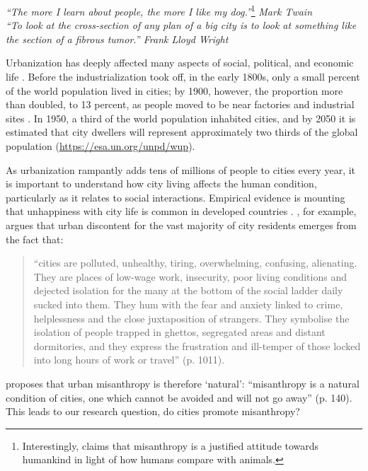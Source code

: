 \documentclass[11pt, letterpaper]{article}
\newcommand{\emd}[1]{\ExecuteMetaData[/tmp/tex]{#1}} %
\begin{document}
\begin{spacing}{1.4} %
\vspace{.25in}

{\small\it \noindent ``The more I learn about people, the more I like my dog.''}\footnote{Interestingly, \citet{cooper2018animals} claims that misanthropy is a justified attitude towards humankind in light of how humans %
    compare with animals.} {\small\it Mark Twain}\\[0.3em]

{\small\it \noindent ``To look at the
 cross-section of any plan of a big city is to look at something like the
 section of a fibrous tumor.'' Frank Lloyd Wright\\}


Urbanization has deeply affected many aspects of social, political, and economic life \citep{kleniewski2010cities}. 
Before the industrialization took off, in the early 1800s, only a small percent of the world population lived in cities; by 1900, however, the proportion more than doubled, to 13 percent, as people moved to be near factories and industrial sites
\citep{davis55}. In 1950, a third of the world population inhabited cities, and by 2050 it is estimated that city dwellers will represent approximately two thirds of the global population (\url{https://esa.un.org/unpd/wup}). 
 
As urbanization rampantly adds tens of millions of people to cities every year,
it is important to understand how city living affects the human condition,
particularly as it relates to social interactions. Empirical evidence is mounting that unhappiness with city life is common in developed countries \citep{aokCityBook15,sorensen14,morrison17,ala18,aok20}. \citet[]{amin06}, for example, argues that urban discontent for the vast majority of city residents emerges from the fact that:
\begin{quote}  ``cities are polluted,
  unhealthy, tiring, overwhelming, confusing, alienating. They are places of low-wage work, insecurity, poor living conditions and dejected isolation for the many at the bottom of the social ladder daily sucked into them. They hum with the fear and anxiety linked to crime, helplessness and the close juxtaposition of strangers. They symbolise the isolation of people trapped in ghettos, segregated areas and distant dormitories, and they express the frustration and ill-temper of those locked into long hours of work or travel'' (p. 1011).\end{quote}
 \citet[]{thrift05} proposes that urban misanthropy is therefore `natural': ``misanthropy is a natural condition of cities, one which cannot be avoided and will not go away'' (p. 140). This leads to our research question, do cities promote misanthropy?
  

\end{spacing}
\end{document}
